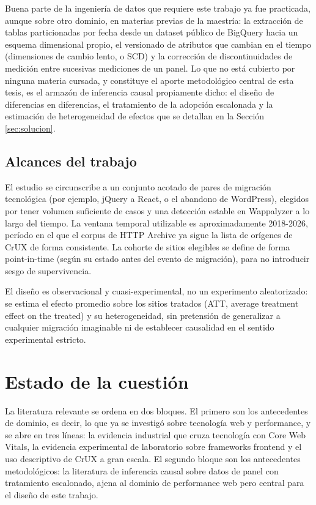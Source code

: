 \documentclass[12pt, a4paper]{article}
\begin{document}
Buena parte de la ingeniería de datos que requiere este trabajo ya fue practicada, aunque sobre otro dominio, en materias previas de la maestría: la extracción de tablas particionadas por fecha desde un dataset público de BigQuery hacia un esquema dimensional propio, el versionado de atributos que cambian en el tiempo (dimensiones de cambio lento, o SCD) y la corrección de discontinuidades de medición entre sucesivas mediciones de un panel. Lo que no está cubierto por ninguna materia cursada, y constituye el aporte metodológico central de esta tesis, es el armazón de inferencia causal propiamente dicho: el diseño de diferencias en diferencias, el tratamiento de la adopción escalonada y la estimación de heterogeneidad de efectos que se detallan en la Sección \ref{sec:solucion}.

\subsection{Alcances del trabajo}

El estudio se circunscribe a un conjunto acotado de pares de migración tecnológica (por ejemplo, jQuery a React, o el abandono de WordPress), elegidos por tener volumen suficiente de casos y una detección estable en Wappalyzer a lo largo del tiempo. La ventana temporal utilizable es aproximadamente 2018-2026, período en el que el corpus de HTTP Archive ya sigue la lista de orígenes de CrUX de forma consistente. La cohorte de sitios elegibles se define de forma point-in-time (según su estado antes del evento de migración), para no introducir sesgo de supervivencia.

El diseño es observacional y cuasi-experimental, no un experimento aleatorizado: se estima el efecto promedio sobre los sitios tratados (ATT, average treatment effect on the treated) y su heterogeneidad, sin pretensión de generalizar a cualquier migración imaginable ni de establecer causalidad en el sentido experimental estricto.

\section{Estado de la cuestión}

La literatura relevante se ordena en dos bloques. El primero son los antecedentes de dominio, es decir, lo que ya se investigó sobre tecnología web y performance, y se abre en tres líneas: la evidencia industrial que cruza tecnología con Core Web Vitals, la evidencia experimental de laboratorio sobre frameworks frontend y el uso descriptivo de CrUX a gran escala. El segundo bloque son los antecedentes metodológicos: la literatura de inferencia causal sobre datos de panel con tratamiento escalonado, ajena al dominio de performance web pero central para el diseño de este trabajo.
\end{document}
